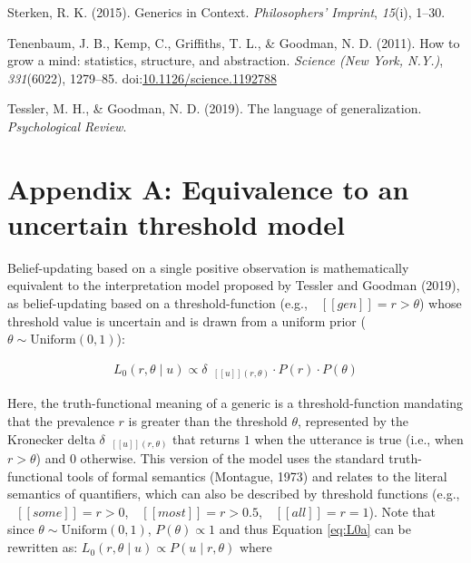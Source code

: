 \documentclass[floatsintext,doc]{apa6}
\begin{document}
\leavevmode\hypertarget{ref-Sterken2015}{}%
Sterken, R. K. (2015). Generics in Context. \emph{Philosophers' Imprint}, \emph{15}(i), 1--30.

\leavevmode\hypertarget{ref-Tenenbaum2011}{}%
Tenenbaum, J. B., Kemp, C., Griffiths, T. L., \& Goodman, N. D. (2011). How to grow a mind: statistics, structure, and abstraction. \emph{Science (New York, N.Y.)}, \emph{331}(6022), 1279--85. doi:\href{https://doi.org/10.1126/science.1192788}{10.1126/science.1192788}

\leavevmode\hypertarget{ref-Tessler2019psychrev}{}%
Tessler, M. H., \& Goodman, N. D. (2019). The language of generalization. \emph{Psychological Review}.

\newpage
\section{Appendix A: Equivalence to an uncertain threshold model}

Belief-updating based on a single positive observation is mathematically equivalent to the interpretation model proposed by Tessler and Goodman (2019), as belief-updating based on a threshold-function (e.g., \(\mbox{ $[\![ gen ]\!]$} = r > \theta\)) whose threshold value is uncertain and is drawn from a uniform prior (\(\theta \sim \text{Uniform}(0, 1)\)):

\begin{align}
L_0(r, \theta \mid u) \propto {\delta_{\mbox{ $[\![ u ]\!]$}(r, \theta)} \cdot P(r) \cdot P(\theta)} \label{eq:L0a}
\end{align}

Here, the truth-functional meaning of a generic is a threshold-function mandating that the prevalence \(r\) is greater than the threshold \(\theta\), represented by the Kronecker delta \(\delta_{\mbox{ $[\![ u ]\!]$}(r, \theta)}\) that returns \(1\) when the utterance is true (i.e., when \(r > \theta\)) and \(0\) otherwise.
%
%
This version of the model uses the standard truth-functional tools of formal semantics (Montague, 1973) and relates to the literal semantics of quantifiers, which can also be described by threshold functions (e.g., \(\mbox{ $[\![ some ]\!]$} = r > 0\), \(\mbox{ $[\![ most ]\!]$} = r > 0.5\), \(\mbox{ $[\![ all ]\!]$} = r = 1\)).
Note that since \(\theta \sim \text{Uniform}(0, 1)\),  \(P(\theta) \propto 1\)  and thus Equation \ref{eq:L0a} can be rewritten as: \(L_0(r, \theta \mid u) \propto P(u \mid r, \theta)\) where
\end{document}
